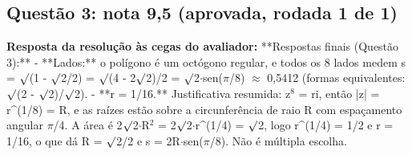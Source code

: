 \documentclass{article}%
\begin{document}
\subsection*{Questão 3: nota 9,5 (aprovada, rodada 1 de 1)}%
\textbf{Resposta da resolução às cegas do avaliador:} **Respostas finais (Questão 3):**\newline%
\newline%
{-} **Lados:** o polígono é um octógono regular, e todos os 8 lados medem s = $\surd$(1 - $\surd$2/2) = $\surd$(4 - 2$\surd$2)/2 = $\surd$2$\cdot$sen($\pi$/8) $\approx$ 0,5412 (formas equivalentes: $\surd$(2 - $\surd$2)/$\surd$2).\newline%
{-} **r = 1/16.**\newline%
\newline%
Justificativa resumida: z$^{8}$ = ri, então |z| = r\^{}(1/8) = R, e as raízes estão sobre a circunferência de raio R com espaçamento angular $\pi$/4. A área é 2$\surd$2$\cdot$R$^2$ = 2$\surd$2$\cdot$r\^{}(1/4) = $\surd$2, logo r\^{}(1/4) = 1/2 e r = 1/16, o que dá R = $\surd$2/2 e s = 2R$\cdot$sen($\pi$/8).\newline%
\newline%
Não é múltipla escolha.\par %
\end{document}
